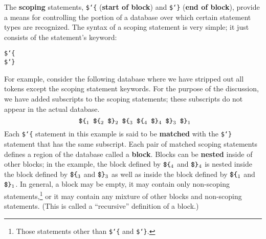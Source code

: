 
The {\bf scoping} statements, \texttt{\$\char`\{} ({\bf start of block}) and \texttt{\$\char`\}}
({\bf end of block}), provide a means for controlling the portion
of a database over which certain statement types are recognized.  The
syntax of a scoping statement is very simple; it just consists of the
statement's keyword:
\begin{center}
\texttt{\$\char`\{}\\
\texttt{\$\char`\}}
\end{center}

For example, consider the following database where we have stripped out
all tokens except the scoping statement keywords.  For the purpose of the
discussion, we have added subscripts to the scoping statements; these subscripts
do not appear in the actual database.
\[
 \mbox{\tt \ \$\char`\{}_1
 \mbox{\tt \ \$\char`\{}_2
 \mbox{\tt \ \$\char`\}}_2
 \mbox{\tt \ \$\char`\{}_3
 \mbox{\tt \ \$\char`\{}_4
 \mbox{\tt \ \$\char`\}}_4
 \mbox{\tt \ \$\char`\}}_3
 \mbox{\tt \ \$\char`\}}_1
\]
Each \texttt{\$\char`\{} statement in this example is said to be {\bf
matched} with the \texttt{\$\char`\}} statement that has the same
subscript.  Each pair of matched scoping statements defines a region of
the database called a {\bf block}. Blocks can be {\bf
nested} inside of other blocks; in the example, the
block defined by $\mbox{\tt \$\char`\{}_4$ and $\mbox{\tt \$\char`\}}_4$
is nested inside the block defined by $\mbox{\tt \$\char`\{}_3$ and
$\mbox{\tt \$\char`\}}_3$ as well as inside the block defined by
$\mbox{\tt \$\char`\{}_1$ and $\mbox{\tt \$\char`\}}_1$.  In general, a
block may be empty, it may contain only non-scoping
statements,\footnote{Those statements other than \texttt{\$\char`\{} and
\texttt{\$\char`\}}.} or it may contain any
mixture of other blocks and non-scoping statements.  (This is called a
``recursive'' definition of a block.)

